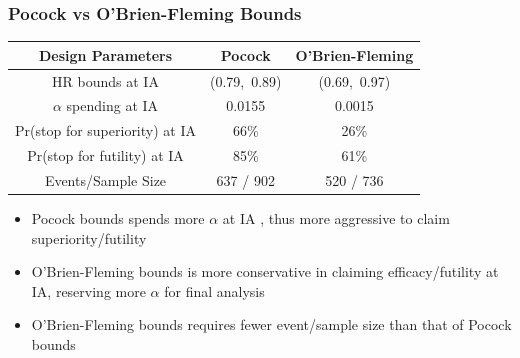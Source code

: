\documentclass{beamer}
\begin{document}
\begin{frame}
	\frametitle{Pocock vs O'Brien-Fleming Bounds}
\begin{table}[ht]
	\renewcommand{\arraystretch}{1.25}
	\centering
	\begin{tabular}{ccc}
 Design Parameters & Pocock & O'Brien-Fleming\\ 
 \hline
 HR bounds at IA & (0.79,\ 0.89) & (0.69,\ 0.97) \\
 $\alpha$ spending at IA & 0.0155 & 0.0015 \\
 Pr(stop for superiority) at IA & 66\% & 26\% \\
 Pr(stop for futility) at IA & 85\% & 61\% \\
 Events/Sample Size & 637 / 902 & 520 / 736 \\ 
 \hline		
\end{tabular}
\end{table}	
\begin{itemize}
	\item Pocock bounds spends more $\alpha$ at IA , thus more aggressive to claim superiority/futility 
	\item O'Brien-Fleming bounds is more conservative in claiming efficacy/futility at IA, reserving more $\alpha$ for final analysis
	\item O'Brien-Fleming bounds requires fewer event/sample size than that of Pocock bounds 
\end{itemize}
\end{frame}
\end{document}
